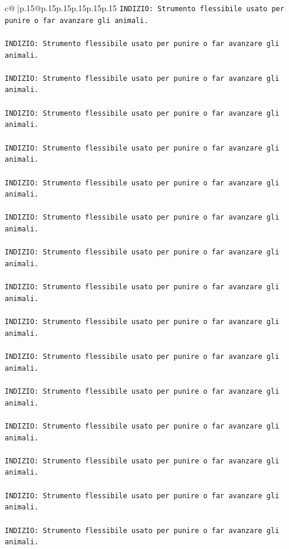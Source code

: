 \documentclass{article}
\begin{document}
{\begin{supertabular}{c@{$\;$}|p{.15\linewidth}@{}p{.15\linewidth}p{.15\linewidth}p{.15\linewidth}p{.15\linewidth}p{.15\linewidth}}
{{{\texttt{INDIZIO: Strumento flessibile usato per punire o far avanzare gli animali.} \\
\\ 
\texttt{INDIZIO: Strumento flessibile usato per punire o far avanzare gli animali.} \\
\\ 
\texttt{INDIZIO: Strumento flessibile usato per punire o far avanzare gli animali.} \\
\\ 
\texttt{INDIZIO: Strumento flessibile usato per punire o far avanzare gli animali.} \\
\\ 
\texttt{INDIZIO: Strumento flessibile usato per punire o far avanzare gli animali.} \\
\\ 
\texttt{INDIZIO: Strumento flessibile usato per punire o far avanzare gli animali.} \\
\\ 
\texttt{INDIZIO: Strumento flessibile usato per punire o far avanzare gli animali.} \\
\\ 
\texttt{INDIZIO: Strumento flessibile usato per punire o far avanzare gli animali.} \\
\\ 
\texttt{INDIZIO: Strumento flessibile usato per punire o far avanzare gli animali.} \\
\\ 
\texttt{INDIZIO: Strumento flessibile usato per punire o far avanzare gli animali.} \\
\\ 
\texttt{INDIZIO: Strumento flessibile usato per punire o far avanzare gli animali.} \\
\\ 
\texttt{INDIZIO: Strumento flessibile usato per punire o far avanzare gli animali.} \\
\\ 
\texttt{INDIZIO: Strumento flessibile usato per punire o far avanzare gli animali.} \\
\\ 
\texttt{INDIZIO: Strumento flessibile usato per punire o far avanzare gli animali.} \\
\\ 
\texttt{INDIZIO: Strumento flessibile usato per punire o far avanzare gli animali.} \\
\\ 
\texttt{INDIZIO: Strumento flessibile usato per punire o far avanzare gli animali.} \\
}}}
\end{supertabular}}
\end{document}
